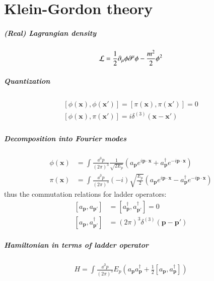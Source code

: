 \chapter{Klein-Gordon theory}
\paragraph{(Real) Lagrangian density}
\begin{align}
	\mathcal{L} = \frac{1}{2} \partial_\mu \phi \partial^\mu \phi - \frac{m^2}{2} \phi^2
\end{align}
\paragraph{Quantization}
\begin{align}
	\begin{split}
		\left[ \phi(\pmb{x}), \phi(\pmb{x}') \right] = \left[ \pi(\pmb{x}), \pi(\pmb{x}') \right] = 0 \\
		\left[ \phi(\pmb{x}), \pi(\pmb{x}') \right] = i \delta^{(3)}(\pmb{x} - \pmb{x}')
	\end{split}
\end{align}
\paragraph{Decomposition into Fourier modes}
\begin{align}
	\phi({\pmb{x}}) &= \int \frac{\dd^3 p}{(2\pi)^3}\frac{1}{\sqrt{2E_p}} \left( a_{\pmb{p}} e^{i\pmb{p}\cdot\pmb{x}} + a_{\pmb{p}}^\dagger e^{-i \pmb{p} \cdot \pmb{x}} \right) \\
	\pi({\pmb{x}}) &= \int \frac{\dd^3 p}{(2\pi)^3}(-i)\sqrt{\frac{E_p}{2}} \left( a_{\pmb{p}} e^{i\pmb{p}\cdot\pmb{x}} - a_{\pmb{p}}^\dagger e^{-i \pmb{p} \cdot \pmb{x}} \right)
\end{align}
thus the commutation relations for ladder operators:
\begin{align}
	\left[ a_{\pmb{p}}, a_{\pmb{p}'} \right] &= \left[ a^\dagger_{\pmb{p}}, a^\dagger_{\pmb{p}'} \right] = 0 \\
	\left[ a_{\pmb{p}}, a^\dagger_{\pmb{p}'} \right] &= (2\pi)^3 \delta^{(3)}(\pmb{p}-\pmb{p}')
\end{align}
\paragraph{Hamiltonian in terms of ladder operator}
\begin{align}
	H = \int \frac{\dd^3 p}{(2\pi)^3} E_p \left( a_{\pmb{p}} a_{\pmb{p}} ^\dagger + \frac{1}{2} \left[ a_{\pmb{p}}, a_{\pmb{p}}^\dagger \right] \right)
\end{align}
